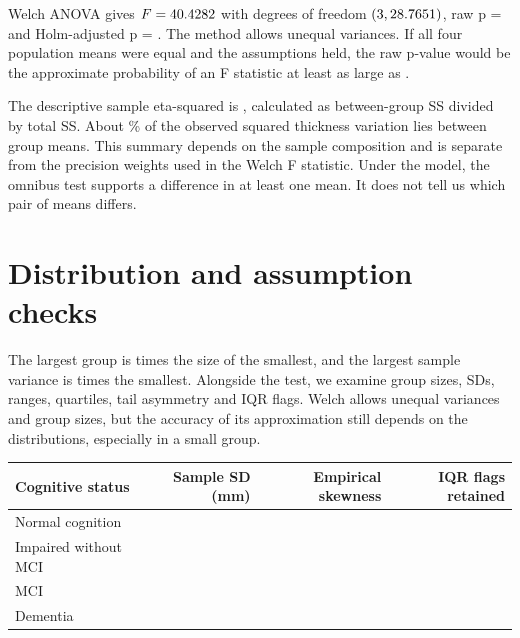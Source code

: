 \documentclass[11pt]{article}
\begin{document}
Welch ANOVA gives $F=40.4282$ with degrees of freedom
$(3,28.7651)$, raw p = \AnovaRawP{} and Holm-adjusted
p = \AnovaHolmP{}. The method allows unequal variances. If all four
population means were equal and the assumptions held, the raw p-value
would be the approximate probability of an F statistic at least as
large as \AnovaF{}.


The descriptive sample eta-squared is \EtaSquared{}, calculated as
between-group SS divided by total SS. About \EtaPercent\% of the observed
squared thickness variation lies between group means. This summary
depends on the sample composition and is separate from the precision
weights used in the Welch F statistic. Under the model, the omnibus test
supports a difference in at least one mean. It does not tell us which
pair of means differs.

\clearpage
\section{Distribution and assumption checks}
The largest group is \SizeRatio{} times the size of the smallest, and
the largest sample variance is \VarianceRatio{} times the smallest.
Alongside the test, we examine group sizes, SDs, ranges, quartiles,
tail asymmetry and IQR flags. Welch allows unequal variances and group
sizes, but the accuracy of its approximation still depends on the
distributions, especially in a small group.

\begin{center}\small
\begin{tabular}{@{}lrrr@{}}
\toprule
Cognitive status & Sample SD (mm) & Empirical skewness & IQR flags retained \\
\midrule
Normal cognition & \NormalSD{} & \NormalSkew{} & \NormalFlags{} \\
Impaired without MCI & \ImpairedSD{} & \ImpairedSkew{} & \ImpairedFlags{} \\
MCI & \MCISD{} & \MCISkew{} & \MCIFlags{} \\
Dementia & \DementiaSD{} & \DementiaSkew{} & \DementiaFlags{} \\
\bottomrule
\end{tabular}
\end{center}
\end{document}
